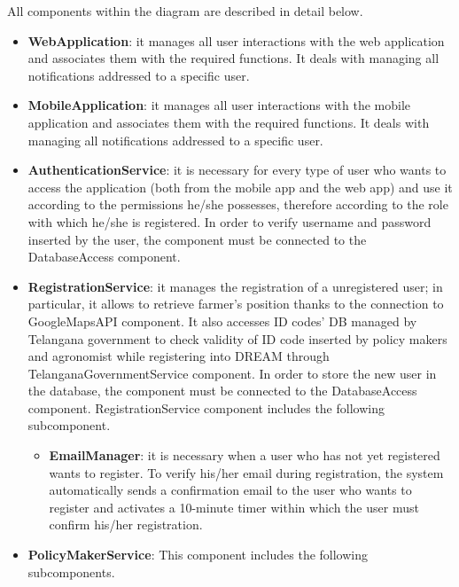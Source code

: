 All components within the diagram are described in detail below.
\begin{itemize}

\item \textbf{WebApplication}: it manages all user interactions with the web application and associates them with the required functions.
It deals with managing all notifications addressed to a specific user.

\item \textbf{MobileApplication}: it manages all user interactions with the mobile application and associates them with the required functions.
It deals with managing all notifications addressed to a specific user.

\item \textbf{AuthenticationService}: it is necessary for every type of user who wants to access the application (both from the mobile app and the web app) and use it according to the permissions he/she possesses, therefore according to the role with which he/she is registered. In order to verify username and password inserted by the user, the component must be connected to the DatabaseAccess component. 

\item \textbf{RegistrationService}: it manages the registration of a unregistered user; in particular, it allows to retrieve farmer's position thanks to the connection to GoogleMapsAPI component. It also accesses ID codes' DB managed by Telangana government to check validity of ID code inserted by policy makers and agronomist while registering into DREAM through TelanganaGovernmentService component.
In order to store the new user in the database, the component must be connected to the DatabaseAccess component. 
RegistrationService component includes the following subcomponent.

\begin{itemize}

\item \textbf{EmailManager}: it is necessary when a user who has not yet registered wants to register. To verify his/her email during registration, the system automatically sends a confirmation email to the user who wants to register and activates a 10-minute timer within which the user must confirm his/her registration.
\end{itemize}
\item \textbf{PolicyMakerService}: This component includes the following subcomponents.


\end{itemize}
